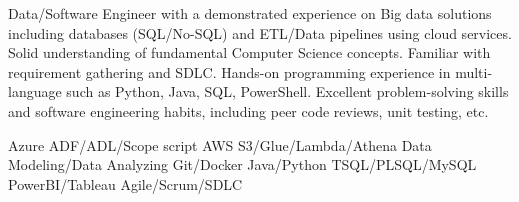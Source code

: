 \documentclass[a4paper]{ReadableCV}
\begin{document}
	






\showHeader{}



Data/Software Engineer with a demonstrated experience on Big data solutions including databases (SQL/No-SQL) and ETL/Data pipelines using cloud services. Solid understanding of fundamental Computer Science concepts. Familiar with requirement gathering and SDLC. Hands-on programming experience in multi-language such as Python, Java, SQL, PowerShell. Excellent problem-solving skills and software engineering habits, including peer code reviews, unit testing, etc.


	      {Azure ADF/ADL/Scope script}
		  {AWS S3/Glue/Lambda/Athena}
		  {Data Modeling/Data Analyzing}
		  {Git/Docker}
		  {Java/Python}
		  {TSQL/PLSQL/MySQL}
		  {PowerBI/Tableau}
		  {Agile/Scrum/SDLC}
		  
		  

\end{document}
